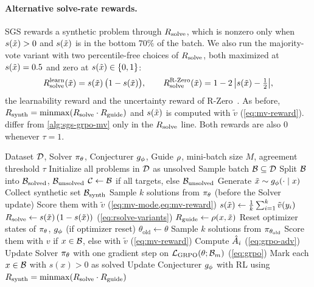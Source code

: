 \paragraph{Alternative solve-rate rewards.}
SGS rewards a synthetic problem through $\Rsolve$, which is nonzero only when
$s(\tilde{x}) > 0$ and $s(\tilde{x})$ is in the bottom $70\%$ of the batch. We also run the
majority-vote variant with two percentile-free choices of $\Rsolve$, both
maximized at $s(\tilde{x}) = 0.5$ and zero at $s(\tilde{x}) \in \{0, 1\}$:
\begin{equation}
  R_{\text{solve}}^{\mathrm{learn}}(\tilde{x}) = s(\tilde{x})\,\big(1 - s(\tilde{x})\big),
  \qquad
  R_{\text{solve}}^{\mathrm{R\text{-}Zero}}(\tilde{x}) = 1 - 2\,\big|s(\tilde{x}) - \tfrac{1}{2}\big|,
  \label{eq:rsolve-variants}
\end{equation}
the learnability reward and the uncertainty reward of R-Zero~\citep{huang2026rzero}.
As before, $R_{\text{synth}} = \operatorname{minmax}(R_{\text{solve}} \cdot R_{\text{guide}})$ and $s(\tilde{x})$ is computed
with $\tilde{v}$ (\cref{eq:mv-reward}). 
differ from \cref{alg:sgs-grpo-mv} only in the $\Rsolve$ line. Both rewards
are also $0$ whenever $\tau = 1$.

\begin{algorithm}[tb]
  \caption{SGS-GRPO with majority-vote rewards and learnability $\Rsolve$ (on-policy Solver update)}
  \label{alg:sgs-grpo-mv-learn}
  \begin{algorithmic}[1]
     Dataset $\mathcal{D}$, Solver $\pi_\theta$, Conjecturer $g_\phi$, Guide $\rho$, mini-batch size $M$, agreement threshold $\tau$
    \STATE Initialize all problems in $\mathcal{D}$ as unsolved
      \STATE Sample batch $\mathcal{B} \subseteq \mathcal{D}$
      \STATE Split $\mathcal{B}$ into $\mathcal{B}_{\mathrm{solved}}$, $\mathcal{B}_{\mathrm{unsolved}}$
      \STATE $\mathcal{C} \leftarrow \mathcal{B}$ if all targets, else $\mathcal{B}_{\mathrm{unsolved}}$
        \STATE Generate $\tilde{x} \sim g_\phi(\cdot \mid x)$
      \ENDFOR
      \STATE Collect synthetic set $\mathcal{B}_{\mathrm{synth}}$
        \STATE Sample $k$ solutions from $\pi_\theta$ (before the Solver update)
        \STATE Score them with $\tilde{v}$ (\cref{eq:mv-mode,eq:mv-reward})
        \STATE $s(\tilde{x}) \leftarrow \frac{1}{k}\sum_{i=1}^{k} \tilde{v}(y_i)$
        \STATE $R_{\text{solve}} \leftarrow s(\tilde{x})\,(1 - s(\tilde{x}))$ (\cref{eq:rsolve-variants})
        \STATE $R_{\text{guide}} \leftarrow \rho(x, \tilde{x})$
      \ENDFOR
      \STATE Reset optimizer states of $\pi_\theta$, $g_\phi$ (if optimizer reset)
        \STATE $\theta_{\mathrm{old}} \leftarrow \theta$
          \STATE Sample $k$ solutions from $\pi_{\theta_{\mathrm{old}}}$
          \STATE Score them with $v$ if $x \in \mathcal{B}$, else with $\tilde{v}$ (\cref{eq:mv-reward})
          \STATE Compute $\hat{A}_i$ (\cref{eq:grpo-adv})
        \ENDFOR
        \STATE Update Solver $\pi_\theta$ with one gradient step on $\mathcal{L}_{\mathrm{GRPO}}(\theta; \mathcal{B}_m)$ (\cref{eq:grpo})
      \ENDFOR
      \STATE Mark each $x \in \mathcal{B}$ with $s(x) > 0$ as solved
      \STATE Update Conjecturer $g_\phi$ with RL using $R_{\text{synth}} = \operatorname{minmax}(R_{\text{solve}} \cdot R_{\text{guide}})$
    \ENDFOR
  \end{algorithmic}
\end{algorithm}


